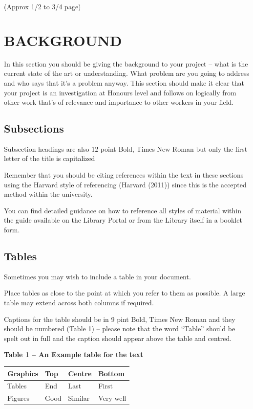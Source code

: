 \documentclass[9pt]{extarticle} %
\begin{document}
\begin{multicols}{2}
(Approx 1/2 to 3/4 page)

\section{BACKGROUND}

In this section you should be giving the background to your project -- what is the current state of the art or understanding. What problem are you going to address and who says that it's a problem anyway. This section should make it clear that your project is an investigation at Honours level and follows on logically from other work that's of relevance and importance to other workers in your field.

\subsection{Subsections}

Subsection headings are also 12 point Bold, Times New Roman but only the first letter of the title is capitalized

Remember that you should be citing references within the text in these sections using the Harvard style of referencing (Harvard (2011)) since this is the accepted method within the university.

You can find detailed guidance on how to reference all styles of material within the guide available on the Library Portal or from the Library itself in a booklet form.

\subsection{Tables}

Sometimes you may wish to include a table in your document. 

Place tables as close to the point at which you refer to them as possible. A large table may extend across both columns if required.

Captions for the table should be in 9 pint Bold, Times New Roman and they should be numbered (Table 1) -- please note that the word ``Table'' should be spelt out in full and the caption should appear above the table and centred.

\begin{center} 
    \textbf{Table 1 -- An Example table for the text}
    \noindent \begin{tabular}{|p{0.6in}|p{0.5in}|p{0.5in}|p{0.6in}|} \hline 
    \textbf{Graphics} & \textbf{Top} & \textbf{Centre} & \textbf{Bottom} \\ \hline 
    Tables & End & Last & First \\ \hline 
    Figures & Good & Similar & Very well \\ \hline 
    \end{tabular}
\end{center}


\end{multicols}
\end{document}
